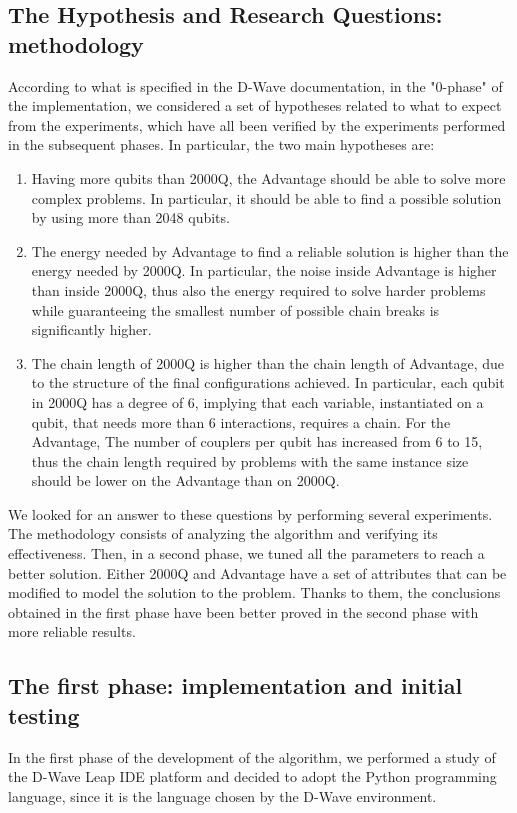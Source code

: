 \documentclass[oneside,a4paper]{article}
\begin{document}
\subsection{The Hypothesis and Research Questions: methodology}
According to what is specified in the D-Wave documentation, in the "0-phase" of the implementation, we considered a set of hypotheses related to what to expect from the experiments, which have all been verified by the experiments performed in the subsequent phases. In particular, the two main hypotheses are:
\begin{enumerate}
    \item Having more qubits than 2000Q, the Advantage should be able to solve more complex problems. In particular, it should be able to find a possible solution by using more than 2048 qubits\cite{WebSite1}. \\
    \item The energy needed by Advantage to find a reliable solution is higher than the energy needed by 2000Q. In particular, the noise inside Advantage is higher than inside 2000Q, thus also the energy required to solve harder problems while guaranteeing the smallest number of possible chain breaks is significantly higher.\\
    \item The chain length of 2000Q is higher than the chain length of Advantage, due to the structure of the final configurations achieved. In particular, each qubit in 2000Q has a degree of 6, implying that each variable, instantiated on a qubit, that needs more than 6 interactions, requires a chain. \cite{WebSite16} For the Advantage, The number of couplers per qubit has increased from 6 to 15, \cite{WebSite17} thus the chain length required by problems with the same instance size should be lower on the Advantage than on 2000Q.\cite{WebSite15}\\
\end{enumerate}
We looked for an answer to these questions by performing several experiments. The methodology consists of analyzing the algorithm and verifying its effectiveness. Then, in a second phase, we tuned all the parameters to reach a better solution. Either 2000Q and Advantage have a set of attributes that can be modified to model the solution to the problem. Thanks to them, the conclusions obtained in the first phase have been better proved in the second phase with more reliable results.

\subsection{The first phase: implementation and initial testing}
In the first phase of the development of the algorithm, we performed a study of the D-Wave Leap IDE platform and decided to adopt the Python programming language, since it is the language chosen by the D-Wave environment. 
\end{document}
